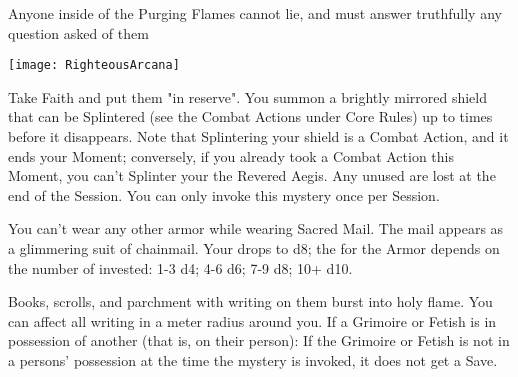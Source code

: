 {Anyone inside of the Purging Flames cannot lie, and must answer truthfully any question asked of them


  \begin{center}
  \texttt{[image: RighteousArcana]}
  \end{center}



\MYSTERY [
  Name = Revered Aegis,
  Link = arcana-mystery-revered-aegis,
  Paradigm = Force,
  Save = n/a,
  Duration = Session,
  Target = Self
]

Take \DICE Faith and put them "in reserve".  You summon a brightly mirrored shield that can be Splintered (see the Combat Actions under Core Rules) up to \DICE times before it disappears.  Note that Splintering your shield is a Combat Action, and it ends your Moment; conversely, if you already took a Combat Action this Moment, you can’t Splinter your the Revered Aegis.  Any unused \DICE are lost at the end of the Session.  You can only invoke this mystery once per Session.

\MYSTERY [
  Name = Sacred Mail,
  Link = arcana-mystery-sacred-mail,
  Paradigm = Force,
  Save = n/a,
  Duration = Session,
  Target = Self
]

You can't wear any other armor while wearing Sacred Mail.  The mail appears as a glimmering suit of chainmail.  Your \MD drops to d8; the \UD for the Armor depends on the number of \DICE invested:  1-3 d4; 4-6 d6; 7-9 d8; 10+ d10.

\MYSTERY [
  Name = Satanic Verses,
  Link = arcana-mystery-satanic-verses,
  Paradigm = Entropy,
  Save = See Below,
  Duration = Instant,
  Target = Close
]

Books, scrolls, and parchment with writing on them burst into holy flame.  You can affect all writing in a \DICE meter radius around you.  If a Grimoire or Fetish is in possession of another (that is, on their person):
If the Grimoire or Fetish is not in a persons' possession at the time the mystery is invoked, it does not get a Save.

}
